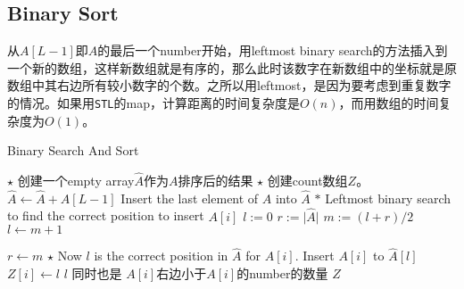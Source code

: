 \subsection{Binary Sort}
从$ A[L-1] $即$ A $的最后一个number开始，用leftmost binary search的方法插入到一个新的数组，这样新数组就是有序的，那么此时该数字在新数组中的坐标就是原数组中其右边所有较小数字的个数。之所以用leftmost，是因为要考虑到重复数字的情况。如果用\texttt{STL}的map，计算距离的时间复杂度是$ O(n) $，而用数组的时间复杂度为$ O(1) $。
\setcounter{algorithm}{0}
\begin{algorithm}[H]
\caption{Binary Search And Sort}
\begin{algorithmic}[1]
\State $\star$ 创建一个empty array$\hat{A}$作为$A$排序后的结果
\State $\star$ 创建count数组$ Z $。
\State $\hat{A}\gets \hat{A} + A[L-1]$ \Comment Insert the last element of $A$ into $ \hat{A} $ 
\State $\ast$ Leftmost binary search to find the correct position to insert $ A[i] $
\State $l:=0$
\State $r:=\lvert \hat{A}\rvert$
\State $ m:=(l+r)/2 $
\State $l\gets m+1$
\end{algorithmic}
\end{algorithm}
\begin{algorithm}[H]
\begin{algorithmic}[1]
\Else
\State $r\gets m$
\EndIf
\EndWhile
\State $\star$ Now $l$ is the correct position in $ \hat{A} $ for $ A[i] $. Insert $A[i]$ to $ \hat{A}[l] $
\State $Z[i]\gets l$ \Comment $l$ 同时也是 $ A[i] $右边小于$ A[i] $的number的数量
\EndFor
\State \Return $ Z $
\EndProcedure
\end{algorithmic}
\end{algorithm}
\setcounter{lstlisting}{0}

